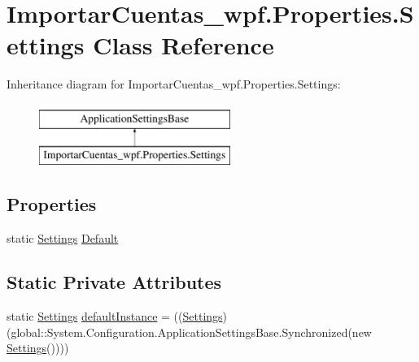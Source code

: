 \hypertarget{class_importar_cuentas__wpf_1_1_properties_1_1_settings}{\section{Importar\-Cuentas\-\_\-wpf.\-Properties.\-Settings Class Reference}
\label{class_importar_cuentas__wpf_1_1_properties_1_1_settings}
}
Inheritance diagram for Importar\-Cuentas\-\_\-wpf.\-Properties.\-Settings\-:\begin{figure}[H]
\begin{center}
\leavevmode
\includegraphics[height=2.000000cm]{d0/dee/class_importar_cuentas__wpf_1_1_properties_1_1_settings}
\end{center}
\end{figure}
\subsection*{Properties}
\begin{DoxyCompactItemize}
\item 
static \hyperlink{class_importar_cuentas__wpf_1_1_properties_1_1_settings}{Settings} \hyperlink{class_importar_cuentas__wpf_1_1_properties_1_1_settings_aa8fd5eae41c6562c29fbf61aca776b32}{Default}
\end{DoxyCompactItemize}
\subsection*{Static Private Attributes}
\begin{DoxyCompactItemize}
\item 
static \hyperlink{class_importar_cuentas__wpf_1_1_properties_1_1_settings}{Settings} \hyperlink{class_importar_cuentas__wpf_1_1_properties_1_1_settings_acf093934d400c122671c08677ca0943c}{default\-Instance} = ((\hyperlink{class_importar_cuentas__wpf_1_1_properties_1_1_settings}{Settings})(global\-::\-System.\-Configuration.\-Application\-Settings\-Base.\-Synchronized(new \hyperlink{class_importar_cuentas__wpf_1_1_properties_1_1_settings}{Settings}())))
\end{DoxyCompactItemize}


